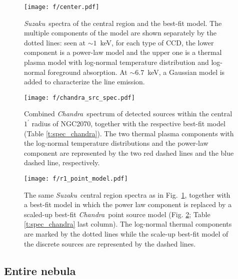 \documentclass[usenatbib]{mnras}
\def\suzaku{{\sl Suzaku}}
\def\chandra{{\sl Chandra}}
\begin{document}
\begin{figure}
\texttt{[image: f/center.pdf]}
\caption{\suzaku\  spectra of the central region and the best-fit model. 
The multiple components of the model are shown separately by the dotted lines:
seen at $\sim 1$~keV, for each type of CCD, the lower component is a power-law model and the upper one is a thermal plasma model with log-normal temperature distribution and log-normal foreground absorption. At $\sim 6.7$~keV, a Gaussian model is added to characterize the line emission.}
\vspace{0.3cm}
\label{f:spec_c}
\end{figure}

\begin{figure}
\texttt{[image: f/chandra\_src\_spec.pdf]}
\caption{Combined \chandra\ spectrum of detected sources within the central $1^{\prime}$ radius of NGC2070, together with the respective best-fit model (Table \ref{t:spec_chandra}). The two thermal plasma components with the log-normal temperature distributions and the power-law component are represented by the two red dashed lines and the blue dashed line, respectively.}
\label{f:spec_chandra}
\end{figure}

\begin{figure}%
\texttt{[image: f/r1\_point\_model.pdf]}
\caption{The same \suzaku\ central region spectra as in Fig.~\ref{f:spec_c}, together with a best-fit model in which the power law component is replaced by a scaled-up best-fit \chandra\ point source model (Fig. \ref{f:spec_chandra}; Table \ref{t:spec_chandra} last column). The log-normal thermal components are marked by the dotted lines while the scale-up best-fit model of the discrete sources are represented by the dashed lines.}
\label{f:center_point}
\vspace{0.2in}
\end{figure}

\subsection{Entire nebula}\label{s:entire}
\end{document}
